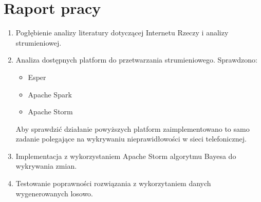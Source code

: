 \documentclass[a4paper,12pt]{scrartcl}
\begin{document}
 \section*{Raport pracy}
	\begin{enumerate}
		\item Pogłębienie analizy literatury dotyczącej Internetu Rzeczy i analizy strumieniowej.
		\item Analiza dostępnych platform do przetwarzania strumieniowego. Sprawdzono:
		\begin{itemize}
			\item Esper
			\item Apache Spark
			\item Apache Storm
		\end{itemize}
		Aby sprawdzić działanie powyższych platform zaimplementowano to samo zadanie polegające
		na wykrywaniu nieprawidłowości w sieci telefonicznej.
		\item Implementacja z wykorzystaniem Apache Storm algorytmu Bayesa do wykrywania zmian.
		\item Testowanie poprawności rozwiązania z wykorzytaniem danych wygenerowanych losowo.

	\end{enumerate}
 
\end{document}
